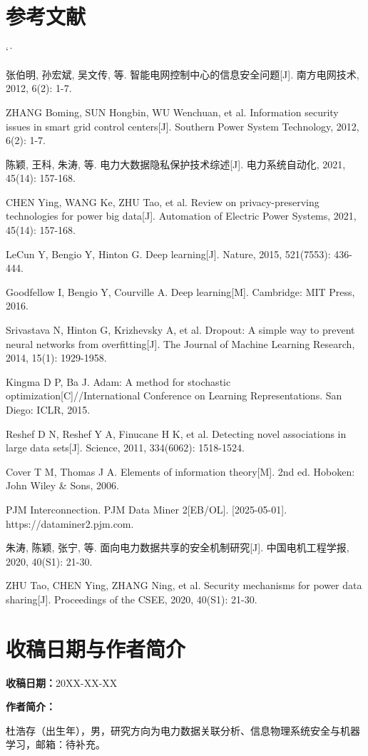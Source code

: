 \documentclass[UTF8,zihao=5,twoside]{ctexart}
\makeatletter
\numberwithin{equation}{section}
\renewcommand{\refname}{参考文献}
\renewenvironment{thebibliography}[1]{%
  \section*{\refname}%
  \small
  \list{[\arabic{enumi}]}{%
    \settowidth\labelwidth{[#1]}%
    \leftmargin\labelwidth
    \advance\leftmargin\labelsep
    \usecounter{enumi}}
  \sloppy\clubpenalty4000\widowpenalty4000\sfcode`\.\ \@m
}{\def\@noitemerr{\@latex@warning{Empty `thebibliography' environment}}\endlist}
\makeatother
\begin{document}
\begin{thebibliography}{99}
张伯明, 孙宏斌, 吴文传, 等. 智能电网控制中心的信息安全问题[J]. 南方电网技术, 2012, 6(2): 1-7.

ZHANG Boming, SUN Hongbin, WU Wenchuan, et al. Information security issues in smart grid control centers[J]. Southern Power System Technology, 2012, 6(2): 1-7.

陈颖, 王科, 朱涛, 等. 电力大数据隐私保护技术综述[J]. 电力系统自动化, 2021, 45(14): 157-168.

CHEN Ying, WANG Ke, ZHU Tao, et al. Review on privacy-preserving technologies for power big data[J]. Automation of Electric Power Systems, 2021, 45(14): 157-168.

LeCun Y, Bengio Y, Hinton G. Deep learning[J]. Nature, 2015, 521(7553): 436-444.

Goodfellow I, Bengio Y, Courville A. Deep learning[M]. Cambridge: MIT Press, 2016.

Srivastava N, Hinton G, Krizhevsky A, et al. Dropout: A simple way to prevent neural networks from overfitting[J]. The Journal of Machine Learning Research, 2014, 15(1): 1929-1958.

Kingma D P, Ba J. Adam: A method for stochastic optimization[C]//International Conference on Learning Representations. San Diego: ICLR, 2015.

Reshef D N, Reshef Y A, Finucane H K, et al. Detecting novel associations in large data sets[J]. Science, 2011, 334(6062): 1518-1524.

Cover T M, Thomas J A. Elements of information theory[M]. 2nd ed. Hoboken: John Wiley \& Sons, 2006.

PJM Interconnection. PJM Data Miner 2[EB/OL]. [2025-05-01]. https://dataminer2.pjm.com.

朱涛, 陈颖, 张宁, 等. 面向电力数据共享的安全机制研究[J]. 中国电机工程学报, 2020, 40(S1): 21-30.

ZHU Tao, CHEN Ying, ZHANG Ning, et al. Security mechanisms for power data sharing[J]. Proceedings of the CSEE, 2020, 40(S1): 21-30.
\end{thebibliography}

\section*{收稿日期与作者简介}
\noindent\textbf{收稿日期：}20XX-XX-XX

\noindent\textbf{作者简介：}\par
\noindent 杜浩存（出生年），男，研究方向为电力数据关联分析、信息物理系统安全与机器学习，邮箱：待补充。
\end{document}
